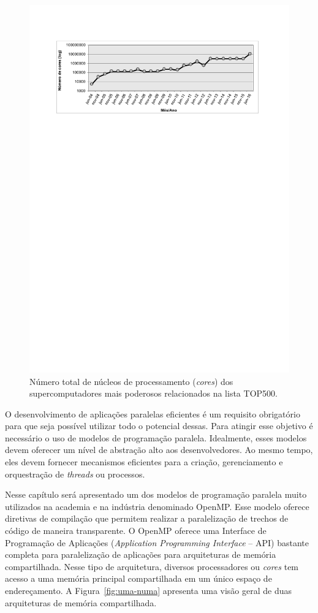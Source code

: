 \documentclass{SBCbookchapter}
\begin{document}
	\begin{figure}[t]
		\centering
		\includegraphics[width=13cm, height=!]{img/cores-top500.pdf}
		\caption{Número total de núcleos de processamento (\emph{cores}) dos
		supercomputadores mais poderosos relacionados na lista TOP500.}
		\label{fig:top500}
	\end{figure}

	O desenvolvimento de aplicações paralelas eficientes é um requisito
	obrigatório para que seja possível utilizar todo o potencial dessas.
	Para atingir esse objetivo é necessário o uso de modelos de programação
	paralela. Idealmente, esses modelos devem oferecer um nível de abstração
	alto aos desenvolvedores. Ao mesmo tempo, eles devem fornecer mecanismos
	eficientes para a criação, gerenciamento e orquestração de
	\textit{threads} ou processos.

	Nesse capítulo será apresentado um dos modelos de programação paralela
	muito utilizados na academia e na indústria denominado OpenMP. Esse
	modelo oferece diretivas de compilação que permitem realizar a
	paralelização de trechos de código de maneira transparente. O OpenMP
	oferece uma Interface de Programação de Aplicações (\textit{Application
	Programming Interface} -- API) bastante completa para paralelização de
	aplicações para arquiteturas de memória compartilhada. Nesse tipo de
	arquitetura, diversos processadores ou \textit{cores} tem acesso a uma
	memória principal compartilhada em um único espaço de endereçamento.
	A Figura~\ref{fig:uma-numa} apresenta uma visão geral de duas arquiteturas
	de memória compartilhada.
\end{document}
